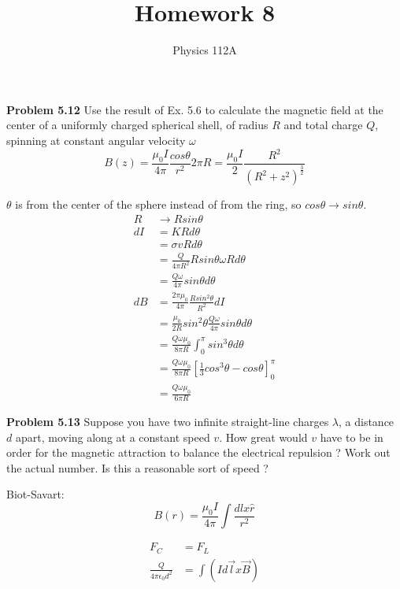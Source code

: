 \documentclass{article}
\title{Homework 8}
\author{Physics 112A}
\date{}
\begin{document}
\maketitle

\textbf{Problem 5.12}
Use the result of Ex. 5.6 to calculate the magnetic field at the center of a uniformly charged spherical shell, of radius $R$ and total charge $Q$, spinning at constant angular velocity $\omega$
$$B(z) = \frac{\mu_0 I}{4 \pi} \frac{cos\theta}{r^2} 2 \pi R = \frac{\mu_0 I}{2} \frac{R^2}{(R^2 + z^2)^{\frac{3}{2}}}$$

$\theta$ is from the center of the sphere instead of from the ring, so $cos\theta \rightarrow sin\theta$.
\begin{equation*}
\begin{split}
	R & \rightarrow R sin\theta \\
	dI & = K R d\theta \\
	& = \sigma v R d\theta \\
	& = \frac{Q}{4 \pi R^2} R sin\theta \omega R d\theta \\
	& = \frac{Q \omega}{4 \pi} sin\theta d\theta \\
	dB & = \frac{2 \pi \mu_0}{4 \pi} \frac{R sin^2\theta}{R^2} dI \\
	& = \frac{\mu_0}{2 R} sin^2\theta \frac{Q \omega}{4 \pi} sin\theta d\theta \\
	& = \frac{Q \omega \mu_0}{8 \pi R} \int_0^\pi sin^3\theta d\theta \\
	& = \frac{Q \omega \mu_0}{8 \pi R} [\frac{1}{3} cos^3\theta - cos\theta]_0^\pi \\
	& = \boxed{\frac{Q \omega \mu_0}{6 \pi R}}
\end{split}
\end{equation*}

\textbf{Problem 5.13}
Suppose you have two infinite straight-line charges $\lambda$, a distance $d$ apart, moving along at a constant speed $v$.
How great would $v$ have to be in order for the magnetic attraction to balance the electrical repulsion ?
Work out the actual number.
Is this a reasonable sort of speed ?


Biot-Savart:
$$B(r) = \frac{\mu_0 I}{4 \pi} \int \frac{dl x \hat{r}}{r^2}$$

\begin{equation*}
\begin{split}
	F_C & = F_L \\
	\frac{Q}{4 \pi \epsilon_0 d^2} & = \int (I d\vec{l} x \vec{B})
\end{split}
\end{equation*}
\end{document}
